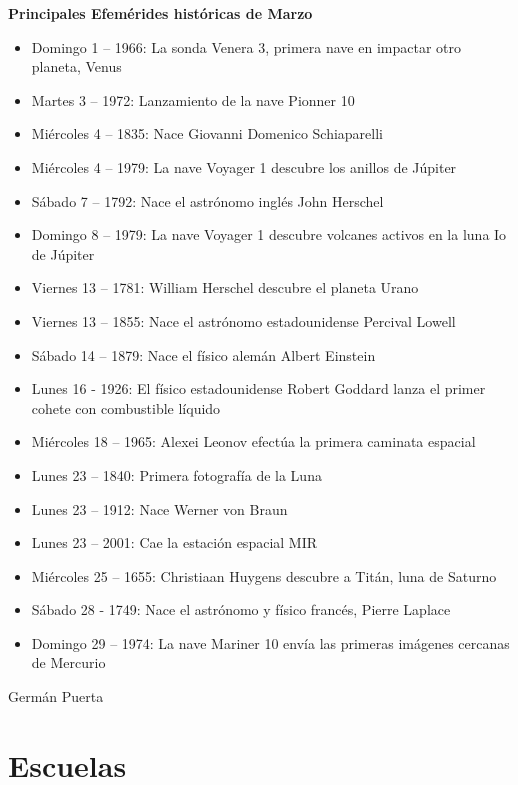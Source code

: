 \documentclass{book}
\begin{document}
\textbf{Principales Efemérides históricas de Marzo}

\begin{itemize}
  \item Domingo 1 – 1966: La sonda Venera 3, primera nave en impactar otro planeta, Venus                     
  \item Martes 3 – 1972: Lanzamiento de la nave Pionner 10
  \item Miércoles 4 – 1835: Nace Giovanni Domenico Schiaparelli
  \item Miércoles 4 – 1979: La nave Voyager 1 descubre los anillos de Júpiter
  \item Sábado 7 – 1792: Nace el astrónomo inglés John Herschel
  \item Domingo 8 – 1979: La nave Voyager 1 descubre volcanes activos en la luna Io de Júpiter
  \item Viernes 13 – 1781: William Herschel descubre el planeta Urano
  \item Viernes 13 – 1855: Nace el astrónomo estadounidense Percival Lowell
  \item Sábado 14 – 1879: Nace el físico alemán Albert Einstein
  \item Lunes 16 - 1926: El físico estadounidense Robert Goddard lanza el primer cohete con combustible líquido
  \item Miércoles 18 – 1965: Alexei Leonov efectúa la primera caminata espacial
  \item Lunes 23 – 1840: Primera fotografía de la Luna
  \item Lunes 23 – 1912: Nace Werner von Braun
  \item Lunes 23 – 2001: Cae la estación espacial MIR
  \item Miércoles 25 – 1655: Christiaan Huygens descubre a Titán, luna de Saturno
  \item Sábado 28 - 1749: Nace el astrónomo y físico francés, Pierre Laplace
  \item Domingo 29 – 1974: La nave Mariner 10 envía las primeras imágenes cercanas de Mercurio    
\end{itemize}

\begin{flushright}
Germán Puerta
\end{flushright}
                   \section*{Escuelas}
\end{document}
